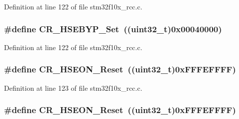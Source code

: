 Definition at line 122 of file stm32f10x\+\_\+rcc.\+c.

\subsubsection[{\texorpdfstring{C\+R\+\_\+\+H\+S\+E\+B\+Y\+P\+\_\+\+Set}{CR_HSEBYP_Set}}]{\setlength{\rightskip}{0pt plus 5cm}\#define C\+R\+\_\+\+H\+S\+E\+B\+Y\+P\+\_\+\+Set~(({\bf uint32\+\_\+t})0x00040000)}\hypertarget{group___r_c_c___private___defines_ga84972845ff646ce1d3902d54dd7b9bc6}{}\label{group___r_c_c___private___defines_ga84972845ff646ce1d3902d54dd7b9bc6}


Definition at line 122 of file stm32f10x\+\_\+rcc.\+c.

\subsubsection[{\texorpdfstring{C\+R\+\_\+\+H\+S\+E\+O\+N\+\_\+\+Reset}{CR_HSEON_Reset}}]{\setlength{\rightskip}{0pt plus 5cm}\#define C\+R\+\_\+\+H\+S\+E\+O\+N\+\_\+\+Reset~(({\bf uint32\+\_\+t})0x\+F\+F\+F\+E\+F\+F\+F\+F)}\hypertarget{group___r_c_c___private___defines_ga8185e6ea6e9abafcdee0e5f58e62805e}{}\label{group___r_c_c___private___defines_ga8185e6ea6e9abafcdee0e5f58e62805e}


Definition at line 123 of file stm32f10x\+\_\+rcc.\+c.

\subsubsection[{\texorpdfstring{C\+R\+\_\+\+H\+S\+E\+O\+N\+\_\+\+Reset}{CR_HSEON_Reset}}]{\setlength{\rightskip}{0pt plus 5cm}\#define C\+R\+\_\+\+H\+S\+E\+O\+N\+\_\+\+Reset~(({\bf uint32\+\_\+t})0x\+F\+F\+F\+E\+F\+F\+F\+F)}\hypertarget{group___r_c_c___private___defines_ga8185e6ea6e9abafcdee0e5f58e62805e}{}\label{group___r_c_c___private___defines_ga8185e6ea6e9abafcdee0e5f58e62805e}


